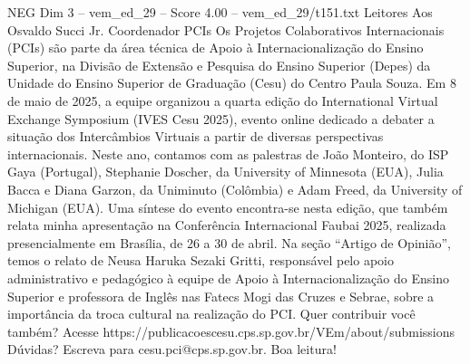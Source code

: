 \begin{textsample}{NEG Dim 3 – vem\_ed\_29 – Score 4.00 – vem\_ed\_29/t151.txt}  \label{ex:f3_neg_172}
Leitores Aos Osvaldo Succi Jr.
Coordenador PCIs Os Projetos Colaborativos Internacionais (PCIs) são parte da área técnica de Apoio à Internacionalização do Ensino Superior, na Divisão de Extensão e Pesquisa do Ensino Superior (Depes) da Unidade do Ensino Superior de Graduação (Cesu) do Centro Paula Souza.
Em 8 de maio de 2025, a equipe organizou a quarta edição do International Virtual Exchange Symposium (IVES Cesu 2025), evento online dedicado a debater a situação dos Intercâmbios Virtuais a partir de diversas perspectivas internacionais.
Neste ano, contamos com as palestras de João Monteiro, do ISP Gaya (Portugal), Stephanie Doscher, da University of Minnesota (EUA), Julia Bacca e Diana Garzon, da Uniminuto (Colômbia) e Adam Freed, da University of Michigan (EUA).
Uma síntese do evento encontra-se nesta edição, que também relata minha apresentação na Conferência Internacional Faubai 2025, realizada presencialmente em Brasília, de 26 a 30 de abril.
Na seção “Artigo de Opinião”, temos o relato de Neusa Haruka Sezaki Gritti, responsável pelo apoio administrativo e pedagógico à equipe de Apoio à Internacionalização do Ensino Superior e professora de Inglês nas Fatecs Mogi das Cruzes e Sebrae, sobre a importância da troca cultural na realização do PCI.
Quer contribuir você também?
Acesse https://publicacoescesu.cps.sp.gov.br/VEm/about/submissions Dúvidas?
Escreva para cesu.pci@cps.sp.gov.br.
Boa leitura!

\end{textsample}
